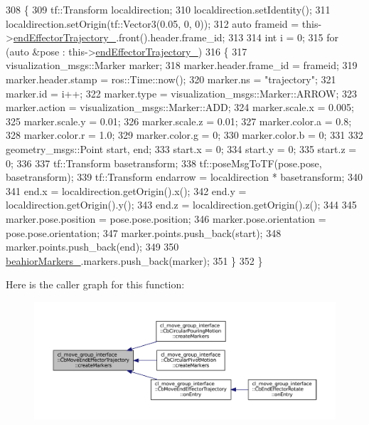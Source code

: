 \begin{DoxyCode}
308     \{
309         tf::Transform localdirection;
310         localdirection.setIdentity();
311         localdirection.setOrigin(tf::Vector3(0.05, 0, 0));
312         \textcolor{keyword}{auto} frameid = this->\hyperlink{classcl__move__group__interface_1_1CbMoveEndEffectorTrajectory_ae13dfd31ea3660646e03882f0c2c29f0}{endEffectorTrajectory\_}.front().header.frame\_id;
313 
314         \textcolor{keywordtype}{int} i = 0;
315         \textcolor{keywordflow}{for} (\textcolor{keyword}{auto} &pose : this->\hyperlink{classcl__move__group__interface_1_1CbMoveEndEffectorTrajectory_ae13dfd31ea3660646e03882f0c2c29f0}{endEffectorTrajectory\_})
316         \{
317             visualization\_msgs::Marker marker;
318             marker.header.frame\_id = frameid;
319             marker.header.stamp = ros::Time::now();
320             marker.ns = \textcolor{stringliteral}{"trajectory"};
321             marker.id = i++;
322             marker.type = visualization\_msgs::Marker::ARROW;
323             marker.action = visualization\_msgs::Marker::ADD;
324             marker.scale.x = 0.005;
325             marker.scale.y = 0.01;
326             marker.scale.z = 0.01;
327             marker.color.a = 0.8;
328             marker.color.r = 1.0;
329             marker.color.g = 0;
330             marker.color.b = 0;
331 
332             geometry\_msgs::Point start, end;
333             start.x = 0;
334             start.y = 0;
335             start.z = 0;
336 
337             tf::Transform basetransform;
338             tf::poseMsgToTF(pose.pose, basetransform);
339             tf::Transform endarrow = localdirection * basetransform;
340 
341             end.x = localdirection.getOrigin().x();
342             end.y = localdirection.getOrigin().y();
343             end.z = localdirection.getOrigin().z();
344 
345             marker.pose.position = pose.pose.position;
346             marker.pose.orientation = pose.pose.orientation;
347             marker.points.push\_back(start);
348             marker.points.push\_back(end);
349 
350             \hyperlink{classcl__move__group__interface_1_1CbMoveEndEffectorTrajectory_a809fb5385adf27c0a1c8f8136566949c}{beahiorMarkers\_}.markers.push\_back(marker);
351         \}
352     \}
\end{DoxyCode}
Here is the caller graph for this function\+:
\nopagebreak
\begin{figure}[H]
\begin{center}
\leavevmode
\includegraphics[width=350pt]{classcl__move__group__interface_1_1CbMoveEndEffectorTrajectory_a442efa1d5bc9e9a16f74ecd31b13d9b5_icgraph}
\end{center}
\end{figure}
